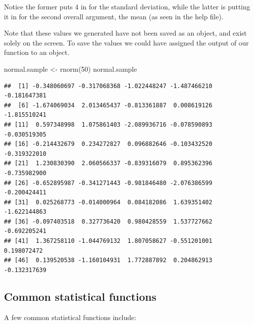 \documentclass[
]{book}
\newenvironment{Shaded}{\begin{snugshade}}{\end{snugshade}}
\newcommand{\DecValTok}[1]{\textcolor[rgb]{0.00,0.00,0.81}{#1}}
\newcommand{\FunctionTok}[1]{\textcolor[rgb]{0.00,0.00,0.00}{#1}}
\newcommand{\NormalTok}[1]{#1}
\newcommand{\OtherTok}[1]{\textcolor[rgb]{0.56,0.35,0.01}{#1}}
\begin{document}
Notice the former puts 4 in for the standard deviation, while the latter is putting it in for the second overall argument, the mean (as seen in the help file).

Note that these values we generated have not been saved as an object, and exist solely on the screen. To save the values we could have assigned the output of our function to an object.

\begin{Shaded}
\begin{Highlighting}[]
\NormalTok{normal.sample }\OtherTok{\textless{}{-}} \FunctionTok{rnorm}\NormalTok{(}\DecValTok{50}\NormalTok{)}
\NormalTok{normal.sample}
\end{Highlighting}
\end{Shaded}

\begin{verbatim}
##  [1] -0.348060697 -0.317068368 -1.022448247 -1.487466210 -0.181647381
##  [6] -1.674069034  2.013465437 -0.813361887  0.008619126 -1.815510241
## [11]  0.597348998  1.075861403 -2.089936716 -0.078590893 -0.030519305
## [16] -0.214432679  0.234272827  0.096882646 -0.103432520 -0.319322010
## [21]  1.230830390  2.060566337 -0.839316079  0.895362396 -0.735982900
## [26] -0.652895987 -0.341271443 -0.981846480 -2.076386599 -0.200424411
## [31]  0.025268773 -0.014000964  0.084182086  1.639351402 -1.622144863
## [36] -0.097403518  0.327736420  0.980428559  1.537727662 -0.692205241
## [41]  1.367258110 -1.044769132  1.807058627 -0.551201001  0.198072472
## [46]  0.139520538 -1.160104931  1.772887892  0.204862913 -0.132317639
\end{verbatim}

\hypertarget{common-statistical-functions}{%
\subsection*{Common statistical functions}\label{common-statistical-functions}}

A few common statistical functions include:
\end{document}
